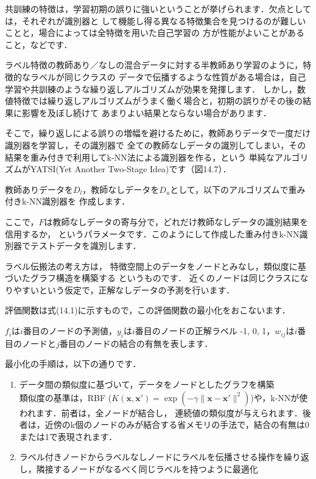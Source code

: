 
共訓練の特徴は，学習初期の誤りに強いということが挙げられます．欠点としては，それぞれが識別器と
して機能し得る異なる特徴集合を見つけるのが難しいことと，場合によっては全特徴を用いた自己学習の
方が性能がよいことがあること，などです．



ラベル特徴の教師あり／なしの混合データに対する半教師あり学習のように，特徴的なラベルが同じクラスの
データで伝播するような性質がある場合は，自己学習や共訓練のような繰り返しアルゴリズムが効果を発揮します．
しかし，数値特徴では繰り返しアルゴリズムがうまく働く場合と，初期の誤りがその後の結果に影響を及ぼし続けて
あまりよい結果とならない場合があります．

そこで，繰り返しによる誤りの増幅を避けるために，教師ありデータで一度だけ識別器を学習し，その識別器で
全ての教師なしデータの識別してしまい，その結果を重み付きで利用してk-NN法による識別器を作る，という
単純なアルゴリズムがYATSI(Yet Another Two-Stage Idea)です（図14.7）．


教師ありデータを$D_l$，教師なしデータを$D_u$として，以下のアルゴリズムで重み付きk-NN識別器を
作成します．


ここで，$F$は教師なしデータの寄与分で，どれだけ教師なしデータの識別結果を信用するか，
というパラメータです．このようにして作成した重み付きk-NN識別器でテストデータを識別します．


ラベル伝搬法の考え方は，
特徴空間上のデータをノードとみなし，類似度に基づいたグラフ構造を構築する
というものです．
近くのノードは同じクラスになりやすいという仮定で，正解なしデータの予測を行います．

評価関数は式(14.1)に示すもので，この評価関数の最小化をおこないます．


$f_i$は$i$番目のノードの予測値，$y_i$は$i$番目のノードの正解ラベル{ -1, 0, 1}，$w_{ij}$は$i$番目のノードと$j$番目のノードの結合の有無を表します．


最小化の手順は，以下の通りです．

\begin{enumerate}
\item データ間の類似度に基づいて，データをノードとしたグラフを構築\\
類似度の基準は，RBF ($K(\bm{x}, \bm{x}') = \exp(-\gamma \| \bm{x} -\bm{x}' \|^2 )$)や，k-NNが使われます．前者は，全ノードが結合し，
連続値の類似度が与えられます．後者は，近傍のk個のノードのみが結合する省メモリの手法で，結合の有無は0または1で表現されます．


\item ラベル付きノードからラベルなしノードにラベルを伝播させる操作を繰り返し，隣接するノードがなるべく同じラベルを持つように最適化
\end{enumerate}

